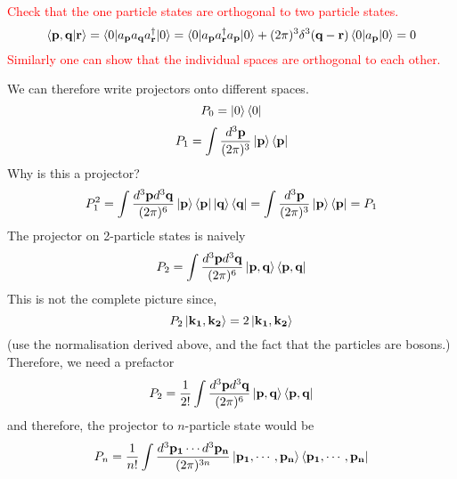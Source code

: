\documentclass[11pt]{article}
\renewcommand{\a}[1]{a_\mathbf{#1}}
\newcommand{\adag}[1]{a^\dagger_\mathbf{#1}}
\numberwithin{equation}{section}
\begin{document}
    \textcolor{red}{
        Check that the one particle states are orthogonal to two particle states.
        \begin{equation*}
            \braket{\textbf{p}, \textbf{q} | \textbf{r}} = \braket{0| \a{p}\a{q}\adag{r}|0} = \braket{0|\a{p}\adag{r}\a{p}|0} + (2\pi)^3\delta^3(\textbf{q} - \textbf{r})\braket{0|\a{p}|0} = 0
        \end{equation*}
        Similarly one can show that the individual spaces are orthogonal to each other.\\
    }

    We can therefore write projectors onto different spaces. 
    \begin{equation*}
        P_0 = \ket{0}\bra{0}
    \end{equation*}
    \begin{equation*}
        P_1 = \int  \frac{d^3\textbf{p}}{(2\pi)^3} \ket{\textbf{p}}\bra{\textbf{p}}
    \end{equation*}
    Why is this a projector? \\
    \begin{equation*}
        P_1^2 = \int  \frac{d^3\textbf{p}d^3\textbf{q}}{(2\pi)^6} \ket{\textbf{p}}\bra{\textbf{p}} \ket{\textbf{q}}\bra{\textbf{q}} = \int  \frac{d^3\textbf{p}}{(2\pi)^3} \ket{\textbf{p}}\bra{\textbf{p}} = P_1
    \end{equation*}
    The projector on 2-particle states is naively
    \begin{equation*}
        P_2 = \int  \frac{d^3\textbf{p}d^3\textbf{q}}{(2\pi)^6} \ket{\textbf{p}, \textbf{q}}\bra{\textbf{p}, \textbf{q}} 
    \end{equation*}
    This is not the complete picture since, 
    \begin{equation*}
        P_2 \ket{\mathbf{k_1}, \mathbf{k_2}} = 2\ket{\mathbf{k_1}, \mathbf{k_2}}
    \end{equation*}
    (use the normalisation derived above, and the fact that the particles are bosons.)\\
    Therefore, we need a prefactor 
    \begin{equation*}
        P_2 = \frac{1}{2!}\int  \frac{d^3\textbf{p}d^3\textbf{q}}{(2\pi)^6} \ket{\textbf{p}, \textbf{q}}\bra{\textbf{p}, \textbf{q}} 
    \end{equation*}
    and therefore, the projector to \(n\)-particle state would be 
    \begin{equation*}
        P_n = \frac{1}{n!}\int  \frac{d^3\mathbf{p_1}\cdots d^3\mathbf{p_n}}{(2\pi)^{3n}} \ket{\mathbf{p_1},\cdots, \mathbf{p_n}}\bra{\mathbf{p_1},\cdots, \mathbf{p_n}} 
    \end{equation*}
\end{document}
